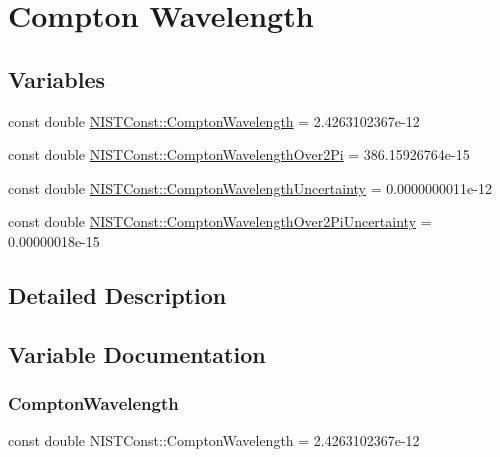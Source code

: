 \hypertarget{group___compton_wavelength}{}\section{Compton Wavelength}
\label{group___compton_wavelength}
\subsection*{Variables}
\begin{DoxyCompactItemize}
\item 
const double \hyperlink{group___compton_wavelength_ga6f9b597d657bd3e9add13a76516cbabc}{N\+I\+S\+T\+Const\+::\+Compton\+Wavelength} = 2.\+4263102367e-\/12
\item 
const double \hyperlink{group___compton_wavelength_ga5031f85750fecb545f0353cb05bb7c69}{N\+I\+S\+T\+Const\+::\+Compton\+Wavelength\+Over2\+Pi} = 386.\+15926764e-\/15
\item 
const double \hyperlink{group___compton_wavelength_ga4845f956ea0bf6f4eaf7396173b09430}{N\+I\+S\+T\+Const\+::\+Compton\+Wavelength\+Uncertainty} = 0.\+0000000011e-\/12
\item 
const double \hyperlink{group___compton_wavelength_ga900f59720b26696c75d2ce455d686a57}{N\+I\+S\+T\+Const\+::\+Compton\+Wavelength\+Over2\+Pi\+Uncertainty} = 0.\+00000018e-\/15
\end{DoxyCompactItemize}


\subsection{Detailed Description}


\subsection{Variable Documentation}
\mbox{\label{group___compton_wavelength_ga6f9b597d657bd3e9add13a76516cbabc}} 
\subsubsection{\texorpdfstring{Compton\+Wavelength}{ComptonWavelength}}
{\footnotesize\ttfamily const double N\+I\+S\+T\+Const\+::\+Compton\+Wavelength = 2.\+4263102367e-\/12}

